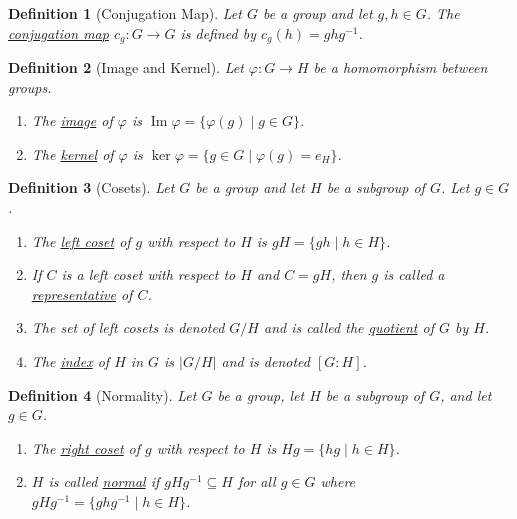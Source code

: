\documentclass[12pt]{article}
\newtheorem{defn}{Definition}
\numberwithin{problem}{section} %
\numberwithin{defn}{section} %
\numberwithin{thm}{section} %
\numberwithin{exer}{section} %
\numberwithin{lma}{section} %
\numberwithin{crlly}{section} %
\theoremstyle{remark}  %
\begin{document}
\setcounter{defn}{21}
\begin{defn}[Conjugation Map]
    Let $G$ be a group and let $g,h\in G$. The \ul{conjugation map} $c_g\operatorname{:} G\to G$ is defined by $c_g(h) = ghg^{-1}$.
\end{defn}

\setcounter{defn}{23}
\begin{defn}[Image and Kernel]
    Let $\varphi\operatorname{:}G\to H$ be a homomorphism between groups.
    \begin{enumerate}
        \item The \ul{image} of $\varphi$ is $\operatorname{Im}\varphi = \{\varphi(g) \mid g \in G\}$.
        \item The \ul{kernel} of $\varphi$ is $\operatorname{ker}\varphi = \{g\in G \mid \varphi(g)=e_H\}$.
    \end{enumerate}
\end{defn}

\setcounter{defn}{26}
\begin{defn}[Cosets]
    Let $G$ be a group and let $H$ be a subgroup of $G$. Let $g\in G$.
    \begin{enumerate}
        \item The \ul{left coset} of $g$ with respect to $H$ is $gH=\{gh \mid h\in H\}$.
        \item If $C$ is a left coset with respect to $H$ and $C=gH$, then $g$ is called a \ul{representative} of $C$.
        \item The set of left cosets is denoted $G/H$ and is called the \ul{quotient} of $G$ by $H$.
        \item The \ul{index} of $H$ in $G$ is $|G/H|$ and is denoted $[G\operatorname{:}H]$.
    \end{enumerate}
\end{defn}

\setcounter{defn}{29}
\begin{defn}[Normality]
    Let $G$ be a group, let $H$ be a subgroup of $G$, and let $g\in G$.
    \begin{enumerate}
        \item The \ul{right coset} of $g$ with respect to $H$ is $Hg= \{hg \mid h \in H\}$.
        \item $H$ is called \ul{normal} if $gHg^{-1}\subseteq H$ for all $g\in G$ where $gHg^{-1}=\{ghg^{-1}\mid h\in H\}$.
    \end{enumerate}
\end{defn}
\end{document}
